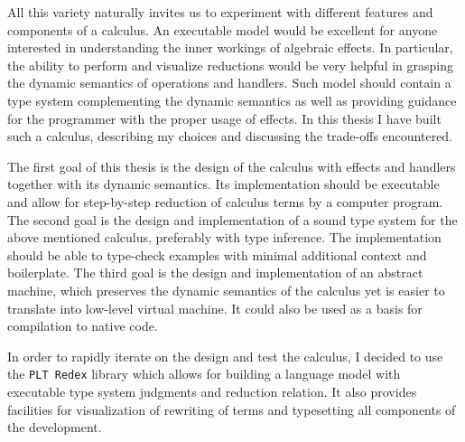 \documentclass[inz, english, longabstract]{iithesis}
\newcommand{\Redex}{\texttt{PLT Redex}}
\begin{document}
All this variety naturally invites us to experiment with different features and components of a calculus.
An executable model would be excellent for anyone interested in understanding the inner workings of algebraic effects.
In particular, the ability to perform and visualize reductions would be very helpful in grasping the dynamic semantics of operations and handlers.
Such model should contain a type system complementing the dynamic semantics as well as providing guidance for the programmer with the proper usage of effects.
In this thesis I have built such a calculus, describing my choices and discussing the trade-offs encountered.

The first goal of this thesis is the design of the calculus with effects and handlers together with its dynamic semantics.
Its implementation should be executable and allow for step-by-step reduction of calculus terms by a computer program.
The second goal is the design and implementation of a sound type system for the above mentioned calculus, preferably with type inference.
The implementation should be able to type-check examples with minimal additional context and boilerplate.
The third goal is the design and implementation of an abstract machine, which preserves the dynamic semantics of the calculus yet is easier to translate into low-level virtual machine.
It could also be used as a basis for compilation to native code.

In order to rapidly iterate on the design and test the calculus, I decided to use the \Redex{} library which allows for building a language model with executable type system judgments and reduction relation.
It also provides facilities for visualization of rewriting of terms and typesetting all components of the development.
\end{document}
